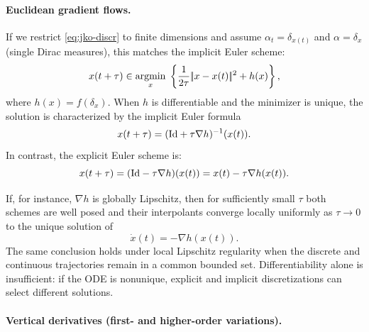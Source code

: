 \paragraph{Euclidean gradient flows.}

If we restrict \eqref{eq:jko-discr} to finite dimensions and assume $\alpha_t = \delta_{x(t)}$ and $\alpha = \delta_x$ (single Dirac measures), this matches the implicit Euler scheme:
\begin{equation*}
    x(t+\tau) \in \underset{x}{\operatorname{argmin}}\;\left\{\frac{1}{2 \tau} |\!| x - x(t) |\!|^2 + h(x)\right\},
\end{equation*}
where $h(x) = f(\delta_x)$. When $h$ is differentiable and the minimizer is unique, the solution is characterized by the implicit Euler formula
\begin{equation*}
    x(t+\tau) = (\mathrm{Id} + \tau \nabla h)^{-1}(x(t)).
\end{equation*}
In contrast, the explicit Euler scheme is:
\begin{equation*}
    x(t+\tau) = (\mathrm{Id} - \tau \nabla h)(x(t)) = x(t) - \tau \nabla h(x(t)).
\end{equation*}

If, for instance, $\nabla h$ is globally Lipschitz, then for sufficiently small $\tau$ both schemes are well posed and their interpolants converge locally uniformly as $\tau\to0$ to the unique solution of
\begin{equation}
    \dot{x}(t) = -\nabla h(x(t)). \label{eq:grad-flow-classical}
\end{equation}
The same conclusion holds under local Lipschitz regularity when the discrete and continuous trajectories remain in a common bounded set. Differentiability alone is insufficient: if the ODE is nonunique, explicit and implicit discretizations can select different solutions.


\paragraph{Vertical derivatives (first- and higher-order variations).}

